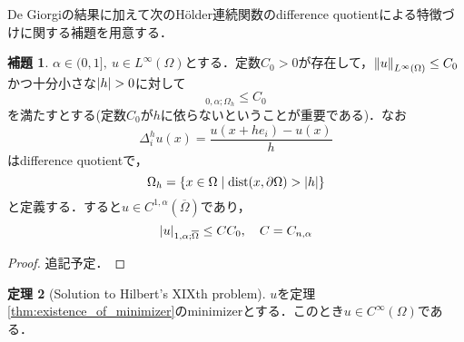 \documentclass[a4paper]{ltjsarticle}
\newcommand{\Om}{\Omega}
\newcommand{\pOm}{\partial\Omega}
\newcommand{\Ombar}{\overline{\Omega}}
\newcommand{\1}{\mathbbm{1}}
\DeclareMathOperator{\dist}{\mathrm{dist}}
\numberwithin{equation}{section}
\theoremstyle{definition}
\newtheorem{thm}{定理}[section]
\newtheorem{lem}[thm]{補題}
\begin{document}
De Giorgiの結果に加えて次のHölder連続関数のdifference quotientによる特徴づけに関する補題を用意する．
\begin{lem}
    $\alpha\in (0,1],\ u\in L^\infty(\Om)$とする．定数$C_0>0$が存在して，$\norm{u}_{L^\infty(\Om)}\leq C_0$かつ十分小さな$\abs{h}>0$に対して
    \begin{equation}
        [\Delta_i^h u]_{0,\alpha;\Om_h}\leq C_0  
    \end{equation}
    を満たすとする(定数$C_0$が$h$に依らないということが重要である)．なお
    \begin{equation}
        \Delta_i^h u(x)=\frac{u(x+he_i)-u(x)}{h}
    \end{equation}
    はdifference quotientで，
    \begin{equation}
        \Om_h=\qty{x\in \Om\mid \dist(x,\pOm)>\abs{h}}
    \end{equation}
    と定義する．すると$u\in C^{1,\alpha}(\Ombar)$であり，
    \begin{equation}
        \abs{u}_{1,\alpha;\Ombar}\leq CC_0,\quad C=C_{n,\alpha}
    \end{equation}
\end{lem}
\begin{proof}
    追記予定．
\end{proof}
\begin{thm}[Solution to Hilbert's XIXth problem]
    $u$を定理\ref{thm:existence_of_minimizer}のminimizerとする．このとき$u\in C^\infty(\Om)$である．
\end{thm}
\end{document}
